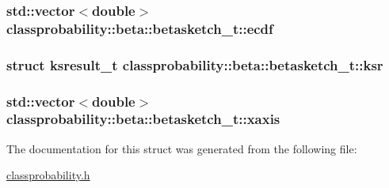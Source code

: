 \subsubsection[{\texorpdfstring{ecdf}{ecdf}}]{\setlength{\rightskip}{0pt plus 5cm}std\+::vector$<$double$>$ classprobability\+::beta\+::betasketch\+\_\+t\+::ecdf}\hypertarget{structclassprobability_1_1beta_1_1betasketch__t_a3111cdadf85f43b8681a6439455b31ff}{}\label{structclassprobability_1_1beta_1_1betasketch__t_a3111cdadf85f43b8681a6439455b31ff}
\subsubsection[{\texorpdfstring{ksr}{ksr}}]{\setlength{\rightskip}{0pt plus 5cm}struct {\bf ksresult\+\_\+t} classprobability\+::beta\+::betasketch\+\_\+t\+::ksr}\hypertarget{structclassprobability_1_1beta_1_1betasketch__t_aeb3ed655d83a116c51cbe6fc0212db9d}{}\label{structclassprobability_1_1beta_1_1betasketch__t_aeb3ed655d83a116c51cbe6fc0212db9d}
\subsubsection[{\texorpdfstring{xaxis}{xaxis}}]{\setlength{\rightskip}{0pt plus 5cm}std\+::vector$<$double$>$ classprobability\+::beta\+::betasketch\+\_\+t\+::xaxis}\hypertarget{structclassprobability_1_1beta_1_1betasketch__t_a61516db859081da178979dbcb9e092e7}{}\label{structclassprobability_1_1beta_1_1betasketch__t_a61516db859081da178979dbcb9e092e7}


The documentation for this struct was generated from the following file\+:\begin{DoxyCompactItemize}
\item 
\hyperlink{classprobability_8h}{classprobability.\+h}\end{DoxyCompactItemize}

